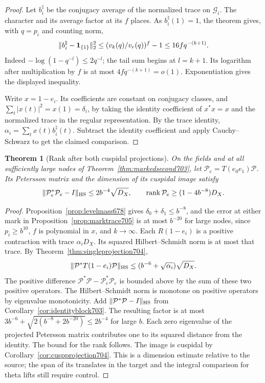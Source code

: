 \documentclass[a4paper,11pt]{article}
\newtheorem{theorem}[proposition]{Theorem}
\theoremstyle{definition}
\theoremstyle{remark}
\numberwithin{equation}{section}
\begin{document}
\begin{proof}
Let \(b_i^\natural\) be the conjugacy average of the normalized
trace on \(\mathcal G_i\). The character and its average
factor at its \(f\) places. As \(b_i^\natural(1)=1\), the
theorem gives, with \(q=p_i\) and counting norm,
\[
  \|b_i^\natural-{\bf1}_{\{1\}}\|_2^2
                   \le (v_k(q)/v_r(q))^f-1
                   \le 16 f q^{-(k+1)} .
\]
Indeed \(-\log(1-q^{-l})\le2q^{-l}\); the tail sum begins
at \(l=k+1\). Its logarithm after multiplication by \(f\)
is at most \(4fq^{-(k+1)}=o(1)\). Exponentiation gives
the displayed inequality.

Write \(x=1-e_i\). Its coefficients are constant on conjugacy
classes, and \(\sum_t|x(t)|^2=x(1)=\delta_i\), by taking the
identity coefficient of \(x^*x=x\) and the normalized trace
in the regular representation. By the trace identity,
\(\alpha_i=\sum_t x(t)b_i^\natural(t)\). Subtract the
identity coefficient and apply Cauchy--Schwarz to get the
claimed comparison.
\end{proof}

\begin{theorem}[Rank after both cuspidal projections]\leavevmode
\label{thm:projectedrank705}
On the fields and at all sufficiently large nodes of
Theorem~\ref{thm:markedsecond703}, let
\(\mathcal P_e=T(e_0e_1)\mathcal P\). Its Petersson matrix
and the dimension of its cuspidal image satisfy
\[
  \|\mathcal P_e^*\mathcal P_e-I\|_{\rm HS}
        \le 2 b^{-4}\sqrt{D_X},\qquad
  \operatorname{rank}\mathcal P_e\ge(1-4b^{-8})D_X .
\]
\end{theorem}
\begin{proof}
Proposition~\ref{prop:levelmass678} gives
\(\delta_0+\delta_1\le b^{-8}\), and the error at either
mark in Proposition~\ref{prop:marktrace705} is at most
\(b^{-20}\) for large nodes, since \(p_i\ge b^{10}\),
\(f\) is polynomial in \(x\), and \(k\to\infty\).
Each \(R(1-e_i)\) is a positive contraction with trace
\(\alpha_iD_X\). Its squared Hilbert--Schmidt norm is at
most that trace. By Theorem~\ref{thm:singleprojection704},
\[
  \|\mathcal P^*T(1-e_i)\mathcal P\|_{\rm HS}
             \le (b^{-6}+\sqrt{\alpha_i})\sqrt{D_X}.
\]
The positive difference
\(\mathcal P^*\mathcal P-\mathcal P_e^*\mathcal P_e\)
is bounded above by the sum of these two positive operators.
The Hilbert--Schmidt norm is monotone on positive operators
by eigenvalue monotonicity. Add
\(\|\mathcal P^*\mathcal P-I\|_{\rm HS}\) from
Corollary~\ref{cor:identityblock703}. The resulting factor
is at most
\(3b^{-6}+\sqrt{2(b^{-8}+2b^{-20})}\le2b^{-4}\)
for large \(b\). Each zero eigenvalue of the projected
Petersson matrix contributes one to its squared distance
from the identity. The bound for the rank follows. The image
is cuspidal by Corollary~\ref{cor:cuspprojection704}. This
is a dimension estimate relative to the source; the span
of its translates in the target and the integral comparison
for theta lifts still require control.
\end{proof}
\end{document}
